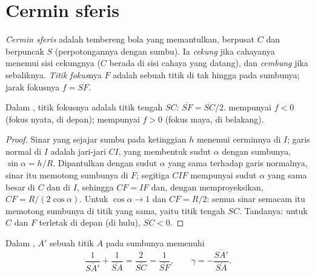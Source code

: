 \section{Cermin sferis}

\begin{definition}\label{def:b1:mirrors-thin-lenses:mirror}
\emph{Cermin sferis} adalah tembereng bola yang memantulkan, berpusat
$C$ dan berpuncak $S$ (perpotongannya dengan sumbu). Ia \emph{cekung}
jika cahayanya menemui sisi cekungnya ($C$ berada di sisi cahaya yang
datang), dan \emph{cembung} jika sebaliknya. \emph{Titik fokus}nya $F$
adalah  sebuah titik di tak hingga pada sumbunya; jarak fokusnya
$f = \overline{SF}$.
\end{definition}

\begin{proposition}\label{prop:b1:mirrors-thin-lenses:focus}
Dalam , titik fokusnya adalah titik tengah $SC$:
$\overline{SF} = \overline{SC}/2$.  mempunyai $f < 0$
(fokus nyata, di depan);  mempunyai $f > 0$ (fokus maya,
di belakang).
\end{proposition}

\begin{proof}
Sinar yang sejajar sumbu pada ketinggian $h$ menemui cerminnya di $I$;
garis normal di $I$ adalah jari-jari $CI$, yang membentuk sudut $\alpha$
dengan sumbunya, $\sin\alpha = h/R$. Dipantulkan dengan sudut $\alpha$
yang sama terhadap garis normalnya, sinar itu memotong sumbunya di $F$;
segitiga $CIF$ mempunyai sudut $\alpha$ yang sama besar di $C$ dan di
$I$, sehingga $CF = IF$ dan, dengan memproyeksikan,
$CF = R/(2\cos\alpha)$. Untuk  $\cos\alpha \to 1$ dan
$CF = R/2$: semua sinar semacam itu memotong sumbunya di titik yang
sama, yaitu titik tengah $SC$. Tandanya: untuk  $C$ dan
$F$ terletak di depan (di hulu), $\overline{SC} < 0$.
\end{proof}

\begin{theorem}\label{thm:b1:mirrors-thin-lenses:mirrorconj}
Dalam ,  $A'$ sebuah titik $A$ pada sumbunya
memenuhi
\[
\frac{1}{\overline{SA'}} + \frac{1}{\overline{SA}} = \frac{2}{\overline{SC}}
= \frac{1}{\overline{SF}},
\qquad
\gamma = -\frac{\overline{SA'}}{\overline{SA}} .
\]
\end{theorem}

